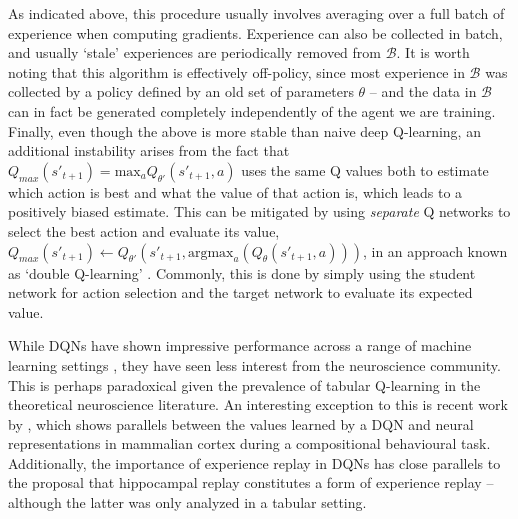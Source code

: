 As indicated above, this procedure usually involves averaging over a full batch of experience when computing gradients.
Experience can also be collected in batch, and usually `stale' experiences are periodically removed from $\mathcal{B}$.
It is worth noting that this algorithm is effectively off-policy, since most experience in $\mathcal{B}$ was collected by a policy defined by an old set of parameters $\theta$ -- and the data in $\mathcal{B}$ can in fact be generated completely independently of the agent we are training.
Finally, even though the above is more stable than naive deep Q-learning, an additional instability arises from the fact that $Q_{max}(s'_{t+1}) = \text{max}_a Q_{\theta'}(s'_{t+1}, a)$ uses the same Q values both to estimate which action is best and what the value of that action is, which leads to a positively biased estimate.
This can be mitigated by using \emph{separate} Q networks to select the best action and evaluate its value, $Q_{max}(s'_{t+1}) \leftarrow Q_{\theta'}(s'_{t+1}, \text{argmax}_a(Q_{\theta}(s'_{t+1}, a)))$, in an approach known as `double Q-learning' \citep{van2016deep}.
Commonly, this is done by simply using the student network for action selection and the target network to evaluate its expected value.

While DQNs have shown impressive performance across a range of machine learning settings \citep{mnih2013playing, lillicrap2015continuous, schaul2015prioritized, kalashnikov2018qt}, they have seen less interest from the neuroscience community.
This is perhaps paradoxical given the prevalence of tabular Q-learning in the theoretical neuroscience literature.
An interesting exception to this is recent work by \citet{makino2023arithmetic}, which shows parallels between the values learned by a DQN and neural representations in mammalian cortex during a compositional behavioural task.
Additionally, the importance of experience replay in DQNs \citep{mnih2013playing, schaul2015prioritized} has close parallels to the proposal that hippocampal replay constitutes a form of experience replay \citep{mattar2018prioritized} -- although the latter was only analyzed in a tabular setting.

